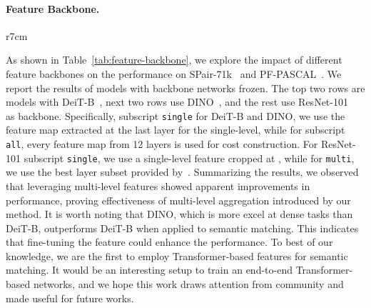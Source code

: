 \paragraph{Feature Backbone.}
\begin{wraptable}{r}{7cm}
\vspace{-15pt}
\caption{\textbf{Ablation study of feature backbone.}}
\label{tab:feature-backbone}\vspace{+5pt}
\centering
{}
\end{wraptable}
As shown in Table~\ref{tab:feature-backbone}, we explore the impact of different feature backbones on the performance on SPair-71k~\cite{min2019spair} and PF-PASCAL~\cite{ham2017proposal}. We report the results of models with backbone networks frozen. The top two rows are models with DeiT-B~\cite{touvron2020deit}, next two rows use DINO~\cite{caron2021emerging}, and the rest use ResNet-101~\cite{he2016deep} as backbone. Specifically, subscript \texttt{single} for DeiT-B and DINO, we use the feature map extracted at the last layer for the single-level, while for subscript \texttt{all}, every feature map from 12 layers is used for cost construction. For ResNet-101 subscript \texttt{single}, we use a single-level feature cropped at , while for \texttt{multi}, we use the best layer subset provided by~\cite{min2019hyperpixel}. Summarizing the results, we observed that leveraging multi-level features showed apparent improvements in performance, proving effectiveness of multi-level aggregation introduced by our method. It is worth noting that DINO, which is more excel at dense tasks than DeiT-B, outperforms DeiT-B when applied to semantic matching. This indicates that fine-tuning the feature could enhance the performance. To best of our knowledge, we are the first to employ Transformer-based features for semantic matching. It would be an interesting setup to train an end-to-end Transformer-based networks, and we hope this work draws attention from community and made useful for future works. \vspace{-5pt}

